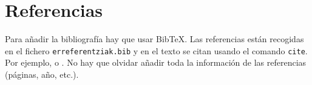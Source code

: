 \section{Referencias}

Para añadir la bibliografía hay que usar BibTeX. Las referencias están recogidas en el fichero \texttt{erreferentziak.bib} y en el texto se citan usando el comando \texttt{cite}. Por ejemplo, \cite{Shahbaba2011} o \cite{Efron1994, Rmanual, Subramanian2005gene}. No hay que olvidar añadir toda la información de las referencias (páginas, año, etc.).